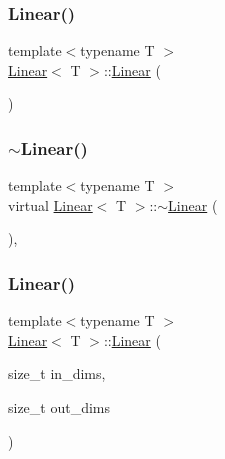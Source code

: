 \subsubsection{\texorpdfstring{Linear()}{Linear()}\hspace{0.1cm}{\footnotesize\ttfamily [1/2]}}
{\footnotesize\ttfamily template$<$typename T $>$ \\
\mbox{\hyperlink{class_linear}{Linear}}$<$ T $>$\+::\mbox{\hyperlink{class_linear}{Linear}} (\begin{DoxyParamCaption}{ }\end{DoxyParamCaption})\hspace{0.3cm}{\ttfamily [default]}}

\mbox{\label{class_linear_a42109067fe1d9da36148f7c4f330b564}} 
\subsubsection{\texorpdfstring{$\sim$Linear()}{~Linear()}}
{\footnotesize\ttfamily template$<$typename T $>$ \\
virtual \mbox{\hyperlink{class_linear}{Linear}}$<$ T $>$\+::$\sim$\mbox{\hyperlink{class_linear}{Linear}} (\begin{DoxyParamCaption}{ }\end{DoxyParamCaption})\hspace{0.3cm}{\ttfamily [virtual]}, {\ttfamily [default]}}

\mbox{\label{class_linear_a335a168705982b1dbf9c16b89465995e}} 
\subsubsection{\texorpdfstring{Linear()}{Linear()}\hspace{0.1cm}{\footnotesize\ttfamily [2/2]}}
{\footnotesize\ttfamily template$<$typename T $>$ \\
\mbox{\hyperlink{class_linear}{Linear}}$<$ T $>$\+::\mbox{\hyperlink{class_linear}{Linear}} (\begin{DoxyParamCaption}\item[{size\+\_\+t}]{in\+\_\+dims,  }\item[{size\+\_\+t}]{out\+\_\+dims }\end{DoxyParamCaption})}



